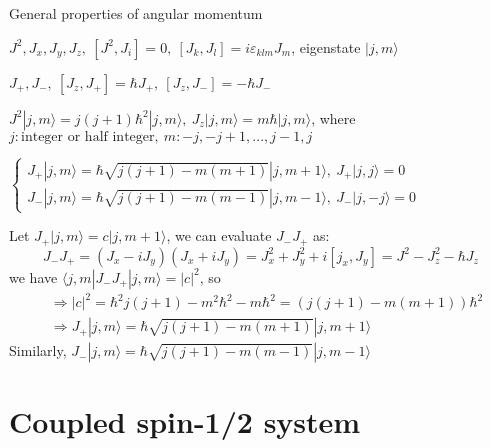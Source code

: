 \documentclass[UTF8,12pt]{article} %
\makeatletter
\newenvironment{proof}[1][\protect\proofname]{\par
\normalfont\topsep6\p@\@plus6\p@\relax
\trivlist
\itemindent\parindent
\item[\hskip\labelsep
\scshape
#1]\ignorespaces
}{%
\endtrivlist\@endpefalse
}
\renewcommand{\proofname}{\it{Solution}}
\makeatother
\begin{document}
\begin{myboxes}{General properties of angular momentum}{}
\begin{enumerate*}
\item $J^{2}, J_{x}, J_{y}, J_{z},~ [J^{2},J_{i}] = 0,~ [J_{k},J_{l}] = i\varepsilon_{klm}J_{m}$, eigenstate $|j,m\rangle$
\item $J_{+},J_{-},~ [J_{z},J_{+}] = \hbar J_{+},~ [J_{z},J_{-}] = -\hbar J_{-}$
\item $J^{2}|j,m\rangle = j(j+1)\hbar^{2}|j,m\rangle,~J_{z}|j,m\rangle = m\hbar|j,m\rangle$, where\\ $j: \text{integer or half integer},~ m: -j,-j+1,...,j-1,j$
\item $\begin{cases}J_{+}|j,m\rangle = \hbar\sqrt{j(j+1)-m(m+1)}|j,m+1\rangle,~ J_{+}|j,j\rangle = 0 \\ J_{-}|j,m\rangle = \hbar\sqrt{j(j+1)-m(m-1)}|j,m-1\rangle,~J_{-}|j,-j\rangle = 0\end{cases}$
\begin{proof}[Proof]
Let $J_{+}|j,m\rangle = c|j,m+1\rangle$, we can evaluate $J_{-}J_{+}$ as:
$$J_{-}J_{+} = (J_{x}-iJ_{y})(J_{x}+iJ_{y}) = J_{x}^{2} + J_{y}^{2} + i[j_{x},J_{y}] = J^{2} - J_{z}^{2} - \hbar J_{z}$$
we have $\langle j,m|J_{-}J_{+}|j,m\rangle = \left|c\right|^{2}$, so
\begin{align*}
&\Rightarrow |c|^{2} = \hbar^{2}j(j+1) - m^{2}\hbar^{2} - m\hbar^{2} = \left(j(j+1)-m(m+1)\right)\hbar^{2}\\
&\Rightarrow J_{+}|j,m\rangle = \hbar\sqrt{j(j+1)-m(m+1)}|j,m+1\rangle
\end{align*}
Similarly, $J_{-}|j,m\rangle = \hbar\sqrt{j(j+1)-m(m-1)}|j,m-1\rangle$
\end{proof}
\end{enumerate*}
\end{myboxes}

\section{Coupled spin-1/2 system}
\end{document}
